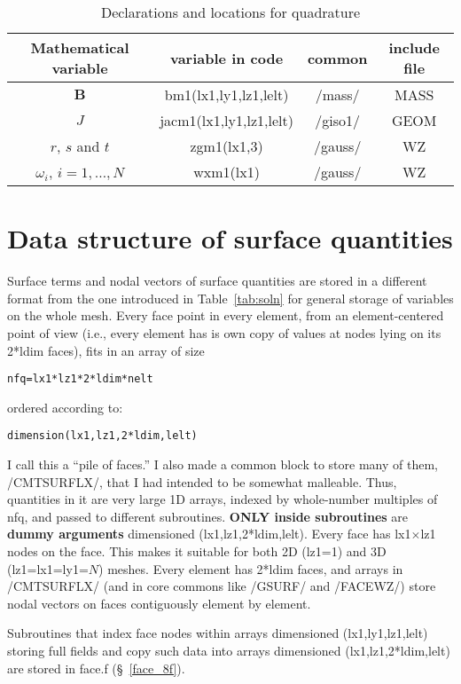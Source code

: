 \begin{table}
\begin{tabular}{|c|c|c|c|}
\hline
Mathematical variable & variable in code        & common & include file \\
\hline
$\mathbf{B}$          & bm1(lx1,ly1,lz1,lelt)   & /mass/ & MASS \\
$J$                   & jacm1(lx1,ly1,lz1,lelt) &  /giso1/ & GEOM \\
$r$, $s$ and $t$      & zgm1(lx1,3)             &  /gauss/ & WZ \\
$\omega_i$, $i=1,\dots,N$ & wxm1(lx1)           &  /gauss/ & WZ \\
\hline
\end{tabular}
\caption{Declarations and locations for quadrature}
\label{tab:mass}
\end{table}

\section{Data structure of surface quantities}\label{sfcdata}
Surface terms and nodal vectors of surface quantities are stored in a different format from
the one introduced in Table~\ref{tab:soln} for general storage of variables on the whole mesh.
Every face point in every element, from an element-centered point of view (i.e., 
every element has is own copy of values at nodes lying on its 2*ldim faces), fits
in an array of size
\begin{verbatim}
nfq=lx1*lz1*2*ldim*nelt
\end{verbatim}%
ordered according to:
\begin{verbatim}
dimension(lx1,lz1,2*ldim,lelt)
\end{verbatim}%
I call this a ``pile of faces.''
I also made a common block to store many of them, /CMTSURFLX/, that I had intended to be somewhat malleable.
Thus, quantities in it are very large 1D arrays, indexed by whole-number multiples of nfq, and
passed to different subroutines. \textbf{ONLY inside subroutines} are \textbf{dummy arguments} dimensioned
(lx1,lz1,2*ldim,lelt). 
Every face has lx1$\times$lz1 nodes on the face. This makes it suitable for both 2D (lz1=1) and 3D (lz1=lx1=ly1=$N$) meshes.
Every element has 2*ldim faces, and arrays in /CMTSURFLX/ (and in core commons like /GSURF/ and /FACEWZ/)
store nodal vectors on faces contiguously element by element.

Subroutines that index face nodes within arrays dimensioned (lx1,ly1,lz1,lelt) storing full fields
and copy such data into arrays dimensioned (lx1,lz1,2*ldim,lelt) are stored in face.f
(\S~\ref{face_8f}).
